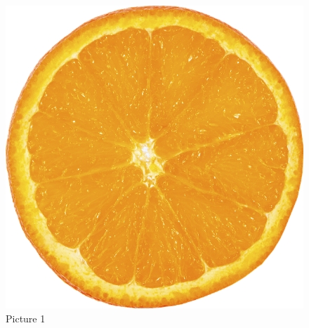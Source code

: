 \begin{figure}[ht]
    \centering
    \includegraphics{fruit-1234657_640.png}
    \caption{Picture 1}
\end{figure}